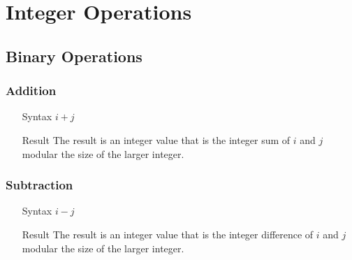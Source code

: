 %
%
%
%
\section{Integer Operations}
\subsection{Binary Operations}
\subsubsection{Addition}
\begin{itemize}
\item[Syntax] $i + j$
\item[Result] The result is an integer value that is the integer sum of $i$ and $j$ modular the size of the larger integer.
\end{itemize}
\subsubsection{Subtraction}
\begin{itemize}
\item[Syntax] $i - j$
\item[Result] The result is an integer value that is the integer difference of $i$ and $j$ modular the size of the larger integer.
\end{itemize}
